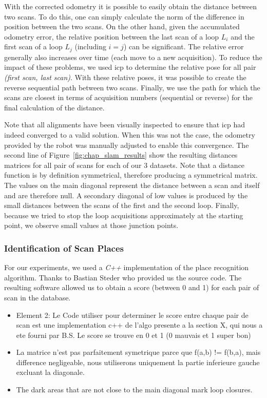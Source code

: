 With the corrected odometry it is possible to easily obtain the distance between two scans. To do this, one can simply calculate the norm of the difference in position between the two scans. On the other hand, given the accumulated odometry error, the relative position between the last scan of a loop $L_i$ and the first scan of a loop $L_j$ (including $i=j$) can be significant. The relative error generally also increases over time (each move to a new acquisition). To reduce the impact of these problems, we used \gls*{icp} to determine the relative pose for all pair \textit{(first scan, last scan)}. With these relative poses, it was possible to create the reverse sequential path between two scans. Finally, we use the path for which the scans are closest in terms of acquisition numbers (sequential or reverse) for the final calculation of the distance.

Note that all alignments have been visually inspected to ensure that \gls*{icp} had indeed converged to a valid solution. When this was not the case, the odometry provided by the robot was manually adjusted to enable this convergence. The second line of Figure~\ref{fig:chap_slam_results} show the resulting distances matrices for all pair of scans for each of our 3 datasets. Note that a distance function is by definition symmetrical, therefore producing a symmetrical matrix. The values on the main diagonal represent the distance between a scan and itself and are therefore null. A secondary diagonal of low values is produced by the small distances between the scans of the first and the second loop. Finally, because we tried to stop the loop acquisitions approximately at the starting point, we observe small values at those junction points.


\subsubsection{Identification of Scan Places}
For our experiments, we used a \textit{C++} implementation of the place recognition algorithm. Thanks to Bastian Steder who provided us the source code. The resulting software allowed us to obtain a score (between 0 and 1) for each pair of scan in the database. 

\begin{itemize}
    \item Element 2: Le Code utiliser pour determiner le score entre chaque pair de scan est une implementation c++ de l'algo presente a la section X, qui nous a ete fourni par B.S. Le score se trouve en 0 et 1 (0 mauvais et 1 super bon)
    \item La matrice n'est pas parfaitement symetrique parce que f(a,b) != f(b,a), mais difference negligeable, nous utiliserons uniquement la partie inferieure gauche excluant la diagonale.
    \item The dark areas that are not close to the main diagonal mark loop closures.
\end{itemize}

